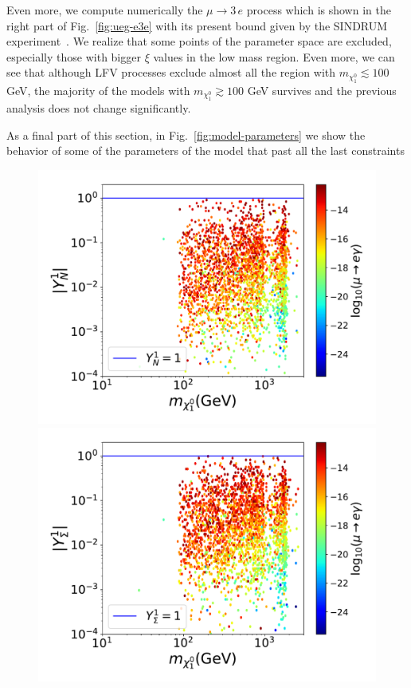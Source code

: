 \documentclass[12pt,letterpaper]{article}
\begin{document}
Even more, we compute numerically the $\mu\rightarrow 3\,e$ process which is shown in the right part of Fig.~\ref{fig:ueg-e3e} with its present bound given by the SINDRUM experiment~\cite{Bertl:1985mw}.
We realize that some points of the parameter space are excluded, especially those with bigger $\xi$ values in the low mass region. Even more, we can see that although LFV processes exclude almost all the region with $m_{\chi^0_1}\lesssim 100$ GeV, the majority of the models with $m_{\chi^0_1} \gtrsim 100$ GeV survives and the previous analysis does not change significantly. 

As a final part of this section, in Fig.~\ref{fig:model-parameters} we show the behavior of some of the parameters of the model that past all the last constraints
\begin{figure}
\begin{center}
\includegraphics[scale=0.4]{YN1}
\includegraphics[scale=0.4]{YTF1}

\end{center}
\end{figure}
\end{document}
